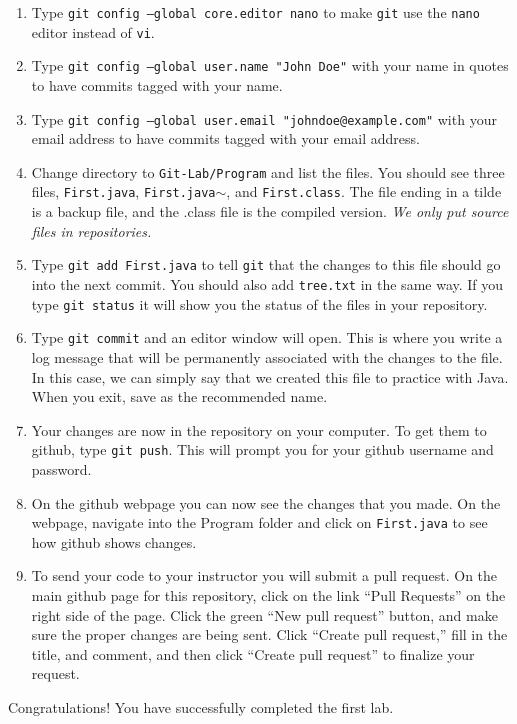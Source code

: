 \documentclass[11pt]{article}
\begin{document}
\begin{enumerate}
\item Type {\tt git config --global core.editor nano} to make {\tt git} use the {\tt nano} editor instead of {\tt vi}.
\item Type {\tt git config --global user.name "John Doe"} with your name in quotes to have commits tagged with your name.
\item Type {\tt git config --global user.email "johndoe@example.com"} with your email address to have commits tagged with your email address.
\item Change directory to {\tt Git-Lab/Program} and list the files.  You should see three files, {\tt First.java}, {\tt First.java$\sim$}, and {\tt First.class}.  The file ending in a tilde is a backup file, and the .class file is the compiled version.  {\em We only put source files in repositories.}
\item Type {\tt git add First.java} to tell {\tt git} that the changes to this file should go into the next commit.  You should also add {\tt tree.txt} in the same way.  If you type {\tt git status} it will show you the status of the files in your repository.
\item Type {\tt git commit} and an editor window will open.  This is where you write a log message that will be permanently associated with the changes to the file.  In this case, we can simply say that we created this file to practice with Java.  When you exit, save as the recommended name.
\item Your changes are now in the repository on your computer.  To get them to github, type {\tt git push}.  This will prompt you for your github username and password.
\item On the github webpage you can now see the changes that you made.  On the webpage, navigate into the Program folder and click on {\tt First.java} to see how github shows changes.
\item To send your code to your instructor you will submit a pull request.  On the main github page for this repository, click on the link ``Pull Requests'' on the right side of the page.  Click the green ``New pull request'' button, and make sure the proper changes are being sent.  Click ``Create pull request,'' fill in the title, and comment, and then click ``Create pull request'' to finalize your request.
\end{enumerate}

Congratulations!  You have successfully completed the first lab.
\end{document}
